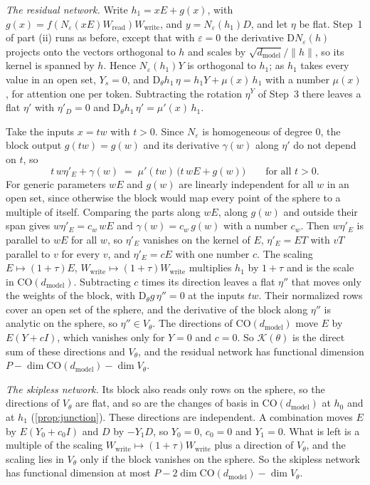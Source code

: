 \documentclass[10pt]{article}
\theoremstyle{definition}
\theoremstyle{remark}
\newcommand{\Wread}{W_{\mathrm{read}}}
\newcommand{\Wwrite}{W_{\mathrm{write}}}
\newcommand{\dm}{d_{\mathrm{model}}}
\newcommand{\CO}{\mathrm{CO}}
\newcommand{\Der}{\mathrm{D}}
\newcommand{\norm}[1]{\lVert #1\rVert}
\begin{document}
\emph{The residual network.} Write $h_1 = xE + g(x)$, with $g(x) = f(N_\varepsilon(xE)\Wread)\Wwrite$, and $y = N_\varepsilon(h_1)D$, and let $\eta$ be flat. Step~1 of part (ii) runs as before, except that with $\varepsilon = 0$ the derivative $\Der N_\varepsilon(h)$ projects onto the vectors orthogonal to $h$ and scales by $\sqrt{\dm}/\norm{h}$, so its kernel is spanned by $h$. Hence $N_\varepsilon(h_1)Y$ is orthogonal to $h_1$; as $h_1$ takes every value in an open set, $Y_s = 0$, and $\Der_\theta h_1\,\eta = h_1Y + \mu(x)\,h_1$ with a number $\mu(x)$, for attention one per token. Subtracting the rotation $\eta^Y$ of Step~3 there leaves a flat $\eta'$ with $\eta'_D = 0$ and $\Der_\theta h_1\,\eta' = \mu'(x)\,h_1$.

Take the inputs $x = tw$ with $t > 0$. Since $N_\varepsilon$ is homogeneous of degree $0$, the block output $g(tw) = g(w)$ and its derivative $\gamma(w)$ along $\eta'$ do not depend on $t$, so
\[
t\,w\eta'_E + \gamma(w) \;=\; \mu'(tw)\,\big(t\,wE + g(w)\big)\qquad\text{for all } t > 0.
\]
For generic parameters $wE$ and $g(w)$ are linearly independent for all $w$ in an open set, since otherwise the block would map every point of the sphere to a multiple of itself. Comparing the parts along $wE$, along $g(w)$ and outside their span gives $w\eta'_E = c_w\,wE$ and $\gamma(w) = c_w\,g(w)$ with a number $c_w$. Then $w\eta'_E$ is parallel to $wE$ for all $w$, so $\eta'_E$ vanishes on the kernel of $E$, $\eta'_E = ET$ with $vT$ parallel to $v$ for every $v$, and $\eta'_E = cE$ with one number $c$. The scaling $E \mapsto (1+\tau)E$, $\Wwrite \mapsto (1+\tau)\Wwrite$ multiplies $h_1$ by $1 + \tau$ and is the scale in $\CO(\dm)$. Subtracting $c$ times its direction leaves a flat $\eta''$ that moves only the weights of the block, with $\Der_\theta g\,\eta'' = 0$ at the inputs $tw$. Their normalized rows cover an open set of the sphere, and the derivative of the block along $\eta''$ is analytic on the sphere, so $\eta'' \in V_\theta$. The directions of $\CO(\dm)$ move $E$ by $E(Y + cI)$, which vanishes only for $Y = 0$ and $c = 0$. So $\mathcal K(\theta)$ is the direct sum of these directions and $V_\theta$, and the residual network has functional dimension $P - \dim\CO(\dm) - \dim V_\theta$.

\emph{The skipless network.} Its block also reads only rows on the sphere, so the directions of $V_\theta$ are flat, and so are the changes of basis in $\CO(\dm)$ at $h_0$ and at $h_1$ (\cref{prop:junction}). These directions are independent. A combination moves $E$ by $E(Y_0 + c_0I)$ and $D$ by $-Y_1D$, so $Y_0 = 0$, $c_0 = 0$ and $Y_1 = 0$. What is left is a multiple of the scaling $\Wwrite \mapsto (1+\tau)\Wwrite$ plus a direction of $V_\theta$, and the scaling lies in $V_\theta$ only if the block vanishes on the sphere. So the skipless network has functional dimension at most $P - 2\dim\CO(\dm) - \dim V_\theta$.
\end{document}

